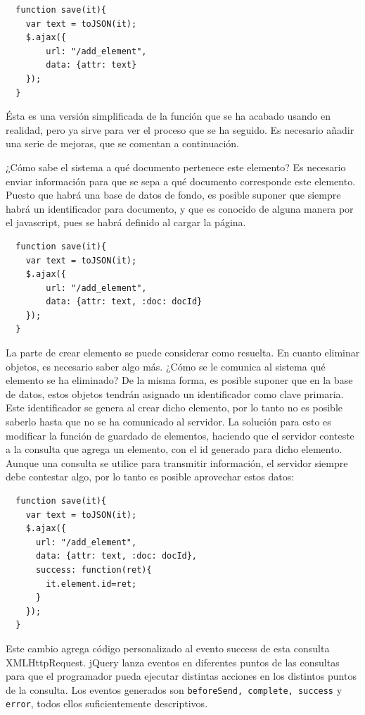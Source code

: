 \begin{verbatim}
  function save(it){
  	var text = toJSON(it);
  	$.ajax({
  		url: "/add_element",
  		data: {attr: text}
  	});
  }
\end{verbatim}

Ésta es una versión simplificada de la función que se ha acabado usando en realidad, pero ya sirve para ver el proceso que se ha seguido. Es necesario añadir una serie de mejoras, que se comentan a continuación.

¿Cómo sabe el sistema a qué documento pertenece este elemento? Es necesario enviar información para que se sepa a qué documento corresponde este elemento. Puesto que habrá una base de datos de fondo, es posible suponer que siempre habrá un identificador para documento, y que es conocido de alguna manera por el javascript, pues se habrá definido al cargar la página.

\begin{verbatim}
  function save(it){
  	var text = toJSON(it);
  	$.ajax({
  		url: "/add_element",
  		data: {attr: text, :doc: docId}
  	});
  }
\end{verbatim}

La parte de crear elemento se puede considerar como resuelta. En cuanto eliminar objetos, es necesario saber algo más. ¿Cómo se le comunica al sistema qué elemento se ha eliminado? De la misma forma, es posible suponer que en la base de datos, estos objetos tendrán asignado un identificador como clave primaria. Este identificador se genera al crear dicho elemento, por lo tanto no es posible saberlo hasta que no se ha comunicado al servidor. La solución para esto es modificar la función de guardado de elementos, haciendo que el servidor conteste a la consulta que agrega un elemento, con el id generado para dicho elemento. Aunque una consulta se utilice para transmitir información, el servidor siempre debe contestar algo, por lo tanto es posible aprovechar estos datos:

\begin{verbatim}
  function save(it){
  	var text = toJSON(it);
  	$.ajax({
  	  url: "/add_element",
  	  data: {attr: text, :doc: docId},
  	  success: function(ret){
  	    it.element.id=ret;
  	  }
  	});
  }
\end{verbatim}

Este cambio agrega código personalizado al evento success de esta consulta XMLHttpRequest. jQuery lanza eventos en diferentes puntos de las consultas para que el programador pueda ejecutar distintas acciones en los distintos puntos de la consulta. Los eventos generados son \texttt{beforeSend, complete, success} y \texttt{error}, todos ellos suficientemente descriptivos.

